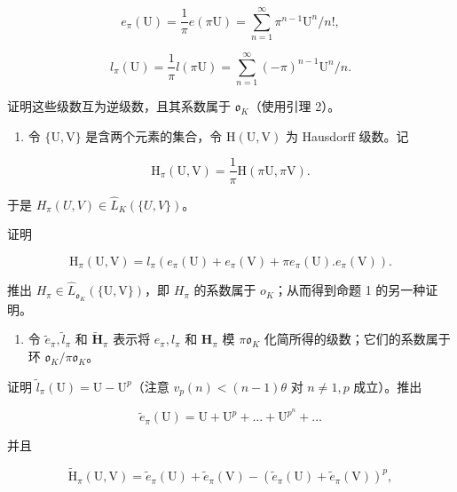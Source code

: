 \[
e _ {\pi} (\mathrm{U}) = \frac {1}{\pi} e (\pi \mathrm{U}) = \sum_ {n = 1} ^ {\infty} \pi^ {n - 1} \mathrm{U} ^ {n} / n!,
\]

\[
l _ {\pi} (\mathrm{U}) = \frac {1}{\pi} l (\pi \mathrm{U}) = \sum_ {n = 1} ^ {\infty} (- \pi) ^ {n - 1} \mathrm{U} ^ {n} / n.
\]

证明这些级数互为逆级数，且其系数属于 \(\mathfrak{o}_{K}\)（使用引理 2）。

\begin{enumerate}
\def\labelenumi{(\alph{enumi})}
\setcounter{enumi}{2}
\tightlist
\item
  令 \(\{\mathrm{U},\mathrm{V}\}\) 是含两个元素的集合，令 \(\mathrm{H}(\mathrm{U},\mathrm{V})\) 为 Hausdorff 级数。记
\end{enumerate}

\[
\mathrm{H} _ {\pi} (\mathrm{U}, \mathrm{V}) = \frac {1}{\pi} \mathrm{H} (\pi \mathrm{U}, \pi \mathrm{V}).
\]

于是 \(H_{\pi}(U, V) \in \hat{L}_{K}(\{U, V\})\)。

证明

\[
\mathrm{H} _ {\pi} (\mathrm{U}, \mathrm{V}) = l _ {\pi} (e _ {\pi} (\mathrm{U}) + e _ {\pi} (\mathrm{V}) + \pi e _ {\pi} (\mathrm{U}). e _ {\pi} (\mathrm{V})).
\]

推出 \(H_{\pi} \in \hat{L}_{\mathfrak{o}_{K}}(\{\mathrm{U}, \mathrm{V}\})\)，即 \(H_{\pi}\) 的系数属于 \(o_{K}\)；从而得到命题 1 的另一种证明。

\begin{enumerate}
\def\labelenumi{(\alph{enumi})}
\setcounter{enumi}{3}
\tightlist
\item
  令 \(\tilde{e}_{\pi}, \tilde{l}_{\pi}\) 和 \(\tilde{\mathbf{H}}_{\pi}\) 表示将 \(e_{\pi}, l_{\pi}\) 和 \(\mathbf{H}_{\pi}\) 模 \(\pi \mathfrak{o}_{K}\) 化简所得的级数；它们的系数属于环 \(\mathfrak{o}_{K} / \pi \mathfrak{o}_{K}\)。
\end{enumerate}

证明 \(\tilde{l}_{\pi}(\mathrm{U}) = \mathrm{U} - \mathrm{U}^{p}\)（注意 \(v_{p}(n) < (n - 1)\theta\) 对 \(n \neq 1, p\) 成立）。推出

\[
\tilde {e} _ {\pi} (\mathrm{U}) = \mathrm{U} + \mathrm{U} ^ {p} + \dots + \mathrm{U} ^ {p ^ {n}} + \dots
\]

并且

\[
\tilde {\mathrm{H}} _ {\pi} (\mathrm{U}, \mathrm{V}) = \tilde {e} _ {\pi} (\mathrm{U}) + \tilde {e} _ {\pi} (\mathrm{V}) - (\tilde {e} _ {\pi} (\mathrm{U}) + \tilde {e} _ {\pi} (\mathrm{V})) ^ {p},
\]


